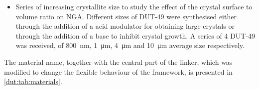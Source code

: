 \begin{itemize}
    \item Series of increasing crystallite size to study the effect 
    of the crystal surface to volume ratio on NGA. Different sizes
    of DUT-49 were synthesised either through the addition of a 
    acid modulator for obtaining large crystals or through the addition
    of a base to inhibit crystal growth. A series of 4 DUT-49 
    was received, of \SI{800}{\nano\metre}, \SI{1}{\micro\metre},
    \SI{4}{\micro\metre} and \SI{10}{\micro\metre} average size 
    respectively.

\end{itemize}



The material name, together with the central part of the linker, 
which was modified to change the flexible behaviour of the framework,
is presented in \autoref{dut:tab:materials}.

